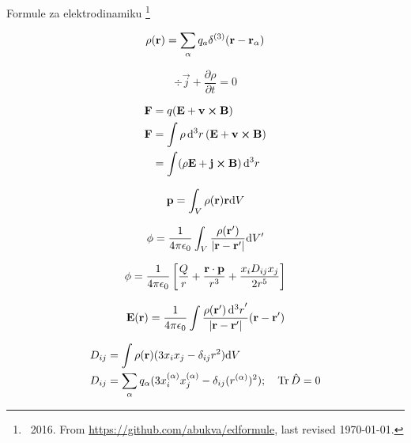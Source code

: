 \documentclass[11pt,twoside]{article}
\date{}
\begin{document}
\begin{center}
Formule za elektrodinamiku \footnote{\textcopyleft \ 2016. From  \url{https://github.com/abukva/edformule}, last revised \today.}
\end{center}
\normalsize
\begin{multicols}{3}

\begin{footnotesize}

\begin{equation}
\rho(\vb{r}) = \sum_\alpha q_a \delta^{(3)}(\vb{r}-\vb{r_\alpha})
\end{equation}

\begin{equation}
\div\vec{j} + \frac{\partial \rho}{\partial t} = 0
\end{equation}

\begin{equation}
\begin{split}
\vb{F} &= q(\vb{E} + \vb{v}\cross\vb{B}) \\
\vb{F} &= \int \rho \dd[3]{r}(\vb{E} + \vb{v}\cross\vb{B}) \\
&= \int (\rho\vb{E} + \vb{j}\cross\vb{B})\dd[3]{r}
\end{split}
\end{equation}

\begin{equation}
\vb{p} = \int_V \rho(\vb{r}) \vb{r} \dd V
\end{equation}

\begin{equation}
\phi = \frac{1}{4 \pi \epsilon_0} \int_V \frac{\rho(\vb{r'})}{|\vb{r}-\vb{r'}|}\dd V'
\end{equation}

\begin{equation}
\phi = \frac{1}{4 \pi \epsilon_0} \left [\frac{Q}{r} + \frac{\vb{r}\cdot\vb{p}}{r^3} + \frac{x_i D_{ij}x_j}{2r^5} \right ]
\end{equation}

\begin{equation}
\vb{E}(\vb{r}) = \frac{1}{4 \pi \epsilon_0} \int \frac{\rho(\vb{r}')\dd[3]{r}'}{\abs{\vb{r}-\vb{r}'}}(\vb{r}-\vb{r}')
\end{equation}

\begin{equation}
\begin{split}
&D_{ij} = \int \rho(\vb{r})(3x_ix_j-\delta_{ij}r^2)\dd V \\
&D_{ij} = \sum_{\alpha} q_{\alpha} ( 3 x_i^{(\alpha)}x_j^{(\alpha)} - \delta_{ij}(r^{(\alpha)})^2); \quad \Tr\hat{D} =0
\end{split}
\end{equation}


\end{footnotesize}
\end{multicols}
\end{document}

